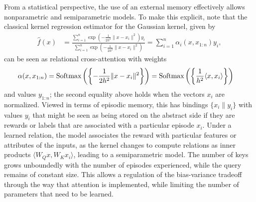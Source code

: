From a statistical perspective, the use of an external memory effectively allows nonparametric and semiparametric models. To make this explicit, note that the classical kernel regression estimator for the Gaussian kernel,
given by
\begin{align*}
  \hat f(x) &= \frac{\sum_{i=1}^n \exp\left(-\frac{1}{2h^2} \|x-x_i\|^2\right) y_i}{\sum_{i=1}^n \exp\left(-\frac{1}{2h^2} \|x-x_i\|^2\right)} 
  = \sum_{i=1}^n \alpha_i(x, x_{1:n}) y_i,
\end{align*}
can be seen as relational cross-attention with weights
\begin{align*}
    \alpha(x, x_{1:n}) &= \Softmax\left(\left\{-\frac{1}{2h^2}\|x-x_i\|^2\right\}\right) 
    = \Softmax\left(\left\{\frac{1}{h^2}\langle x, x_i\rangle\right\}\right)
\end{align*}
and values $y_{1:n}$; the second equality above holds when the vectors $x_i$ are normalized.
Viewed in terms of episodic memory, this has bindings $\{x_i\| y_i\}$ with values $y_i$ that 
might be seen as being stored on the abstract side if they are rewards or labels that are associated with 
a particular episode $x_i$. Under a learned relation, the model associates the reward with particular features or attributes of the inputs, as the kernel changes to compute relations as inner products $\langle W_Q x, W_K x_i \rangle$, leading to a semiparametric model. The number of keys grows unboundedly with the number of episodes experienced, while the query remains of constant size. This allows a regulation of the bias-variance tradeoff through the way that attention is implemented, while limiting the number of parameters that need to be learned.

